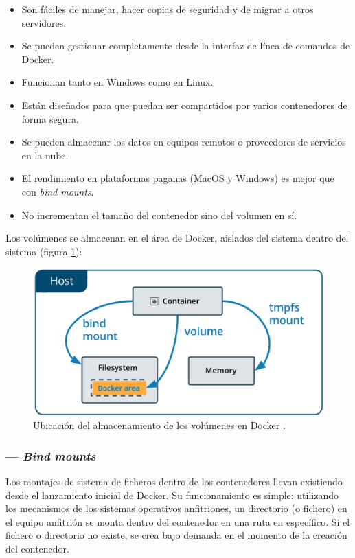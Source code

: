 \begin{itemize}
    \item Son fáciles de manejar, hacer copias de seguridad y de migrar a otros servidores.
    \item Se pueden gestionar completamente desde la interfaz de línea de comandos de Docker.
    \item Funcionan tanto en Windows como en Linux.
    \item Están diseñados para que puedan ser compartidos por varios contenedores de forma segura.
    \item Se pueden almacenar los datos en equipos remotos o proveedores de servicios en la nube.
    \item El rendimiento en plataformas paganas (MacOS y Windows) es mejor que con \textit{bind mounts}.
    \item No incrementan el tamaño del contenedor sino del volumen en sí.
\end{itemize}

Los volúmenes se almacenan en el área de Docker, aislados del sistema dentro del sistema
(figura \ref{fig:volumes-location}):

\begin{figure}[H]
    \centering
    \includegraphics[width=.7\linewidth]{pictures/types-of-mounts-volume.png}
    \caption{Ubicación del almacenamiento de los volúmenes en Docker \cite{UseVolumes2021}.}
    \label{fig:volumes-location}
\end{figure}

\subsubsection*{\indent --- \textit{Bind mounts}}
Los montajes de sistema de ficheros dentro de los contenedores llevan existiendo desde
el lanzamiento inicial de Docker. Su funcionamiento es simple: utilizando los
mecanismos de los sistemas operativos anfitriones, un directorio (o fichero)
en el equipo anfitrión se monta dentro del contenedor en una ruta en específico.
Si el fichero o directorio no existe, se crea bajo demanda en el momento de la
creación del contenedor.

